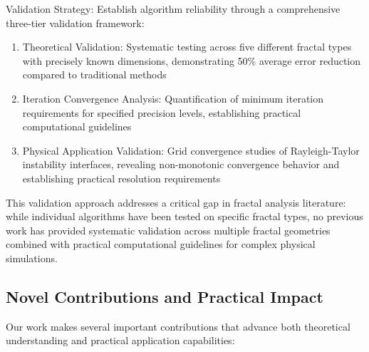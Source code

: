 \documentclass[preprint,12pt]{elsarticle}
\def\textbf#1{#1}%
\begin{document}
\textbf{Validation Strategy}: Establish algorithm reliability through a comprehensive three-tier validation framework:

\begin{enumerate}
\item \textbf{Theoretical Validation}: Systematic testing across five different fractal types with precisely known dimensions, demonstrating 50\% average error reduction compared to traditional methods

\item \textbf{Iteration Convergence Analysis}: Quantification of minimum iteration requirements for specified precision levels, establishing practical computational guidelines

\item \textbf{Physical Application Validation}: Grid convergence studies of Rayleigh-Taylor instability interfaces, revealing non-monotonic convergence behavior and establishing practical resolution requirements
\end{enumerate}

This validation approach addresses a critical gap in fractal analysis literature: while individual algorithms have been tested on specific fractal types, no previous work has provided systematic validation across multiple fractal geometries combined with practical computational guidelines for complex physical simulations.

\subsection{Novel Contributions and Practical Impact}

Our work makes several important contributions that advance both theoretical understanding and practical application capabilities:
\end{document}
